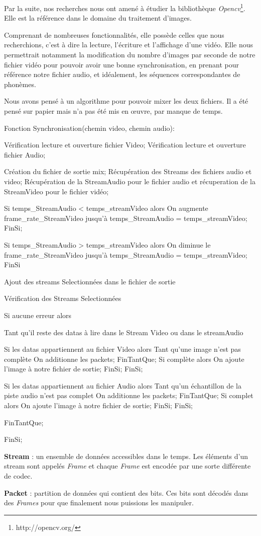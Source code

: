 Par la suite, nos recherches nous ont amené à étudier la bibliothèque \textit{Opencv}\footnote{http://opencv.org/}. Elle est la référence dans le domaine du traitement d'images.

Comprenant de nombreuses fonctionnalités, elle possède celles que nous recherchions, c'est à dire la lecture, l'écriture et l'affichage d’une vidéo. Elle nous permettrait notamment la modification du nombre d'images par seconde de notre fichier vidéo pour pouvoir avoir une bonne synchronisation, en prenant pour référence notre fichier audio, et idéalement, les séquences correspondantes de phonèmes.

Nous avons pensé à un algorithme pour pouvoir mixer les deux fichiers. Il a été pensé sur papier mais n'a pas été mis en œuvre, par manque de temps.

\begin{verbnobox}[\small]

Fonction Synchronisation(chemin video, chemin audio):

Vérification lecture et ouverture fichier Video;
Vérification lecture et ouverture  fichier Audio;

Création du fichier de sortie mix;
Récupération des Streams des fichiers audio et video;
Récupération de la StreamAudio pour le fichier audio et récuperation de la StreamVideo pour le fichier vidéo;

Si temps_StreamAudio < temps_streamVideo alors
  On augmente frame_rate_StreamVideo jusqu'à temps_StreamAudio = temps_streamVideo;
FinSi;

Si temps_StreamAudio > temps_streamVideo alors
  On diminue le  frame_rate_StreamVideo jusqu'à temps_StreamAudio = temps_streamVideo;
FinSi

Ajout des streams Selectionnées dans le fichier de sortie

Vérification des Streams Selectionnées

Si aucune erreur alors 

  Tant qu'il reste des datas à lire dans le Stream Video ou dans le streamAudio

    Si les datas appartiennent au fichier Video alors
      Tant qu'une image n'est pas complète
	On additionne les packets;
      FinTantQue;
      Si complète alors
	On ajoute l'image à notre fichier de sortie;
      FinSi;
    FinSi;


    Si les datas appartiennent au fichier Audio alors
      Tant qu'un échantillon de la piste audio n'est pas complet
	On additionne les packets;
      FinTantQue;
      Si complet alors
	On ajoute l'image à notre fichier de sortie;
      FinSi;
    FinSi;
    
  FinTantQue;
  
FinSi;

\end{verbnobox}

\textbf{Stream} : un ensemble de données accessibles dans le temps. Les éléments d'un stream sont appelés \textit{Frame} et chaque \textit{Frame} est encodée par une sorte différente de codec.


\textbf{Packet} : partition de données qui contient des bits. Ces bits sont décodés dans des \textit{Frames} pour que finalement nous puissions les manipuler.